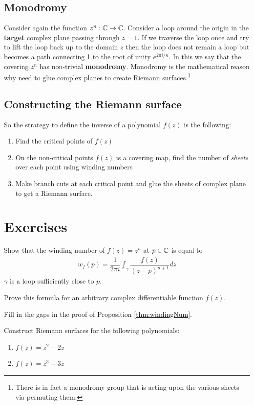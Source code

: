 \subsection{Monodromy}
Consider again the function $z^n: \mathbb{C} \rightarrow \mathbb{C}$. Consider a loop around the origin in the \textbf{target} complex plane passing through $z=1$. If we traverse the loop once and try to lift the loop back up to the domain $z$ then the loop does not remain a loop but becomes a path connecting 1 to the root of unity $e^{2 \pi i/n}$. In this we say that the covering $z^n$ has non-trivial \textbf{monodromy}. Monodromy is the mathematical reason why need to glue complex planes to create Riemann surfaces.\footnote{There is in fact a monodromy group that is acting upon the various sheets via permuting them.}



\subsection{Constructing the Riemann surface}

So the strategy to define the inverse of a polynomial $f(z)$ is the following:
\begin{enumerate}
	\item Find the critical points of $f(z)$
	\item On the non-critical points $f(z)$ is a covering map, find the number of \emph{sheets} over each point using winding numbers
	\item Make branch cuts at each critical point and glue the sheets of complex plane to get a Riemann surface.
\end{enumerate}




\section{Exercises}

\begin{exercise}
	Show that the winding number of $f(z) = z^n$ at $p \in \mathbb{C}$ is equal to
	\begin{align}
		w_f(p) = \dfrac{1}{2 \pi i} \int_{\gamma} \dfrac{f(z)}{(z-p)^{n+1}} dz
	\end{align}
	$\gamma$ is a loop sufficiently close to $p$.

	Prove this formula for an arbitrary complex differentiable function $f(z)$.
\end{exercise}


\begin{exercise}
	Fill in the gaps in the proof of Proposition \ref{thm:windingNum}.
\end{exercise}


\begin{exercise}
	Construct Riemann surfaces for the following polynomials:
	\begin{enumerate}
		\item $f(z) = z^2 - 2 z$
		\item $f(z) = z^3 - 3z$
	\end{enumerate}
\end{exercise}



